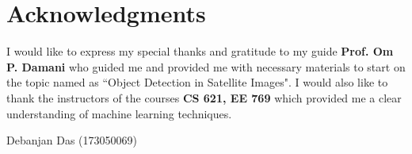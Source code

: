 \cleardoublepage
{}
{}
\chapter*{Acknowledgments}
\vspace{0.25in}
I would like to express my special thanks and gratitude to my guide \textbf{Prof. Om P. Damani} who guided me and provided me with necessary materials to start on the topic named as ``Object Detection in Satellite Images". I would also like to thank the instructors of the courses \textbf{CS 621, EE 769} which provided me a clear understanding of machine learning techniques.
\vspace{0.6in}

\tab\tab\tab\tab\tab\tab\tab\tab\tab\tab Debanjan Das (173050069)\\
